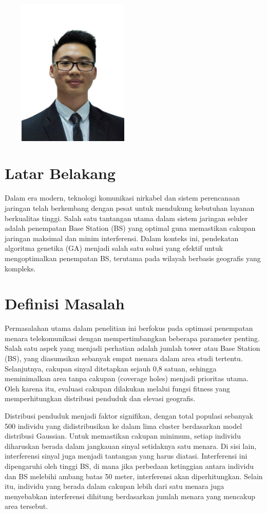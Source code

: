 \begin{center}
\includegraphics[height=200pt, width=200pt, alt=KA logo]{pp-biografi.jpg}
\end{center}
\section{Latar Belakang}
Dalam era modern, teknologi komunikasi nirkabel dan sistem perencanaan jaringan telah berkembang dengan pesat untuk mendukung kebutuhan layanan berkualitas tinggi. Salah satu tantangan utama dalam sistem jaringan seluler adalah penempatan Base Station (BS) yang optimal guna memastikan cakupan jaringan maksimal dan minim interferensi. Dalam konteks ini, pendekatan algoritma genetika (GA) menjadi salah satu solusi yang efektif untuk mengoptimalkan penempatan BS, terutama pada wilayah berbasis geografis yang kompleks.

\section{Definisi Masalah}
Permasalahan utama dalam penelitian ini berfokus pada optimasi penempatan menara telekomunikasi dengan mempertimbangkan beberapa parameter penting. Salah satu aspek yang menjadi perhatian adalah jumlah tower atau Base Station (BS), yang diasumsikan sebanyak empat menara dalam area studi tertentu. Selanjutnya, cakupan sinyal ditetapkan sejauh 0,8 satuan, sehingga meminimalkan area tanpa cakupan (coverage holes) menjadi prioritas utama. Oleh karena itu, evaluasi cakupan dilakukan melalui fungsi fitness yang memperhitungkan distribusi penduduk dan elevasi geografis.

Distribusi penduduk menjadi faktor signifikan, dengan total populasi sebanyak 500 individu yang didistribusikan ke dalam lima cluster berdasarkan model distribusi Gaussian. Untuk memastikan cakupan minimum, setiap individu diharuskan berada dalam jangkauan sinyal setidaknya satu menara. Di sisi lain, interferensi sinyal juga menjadi tantangan yang harus diatasi. Interferensi ini dipengaruhi oleh tinggi BS, di mana jika perbedaan ketinggian antara individu dan BS melebihi ambang batas 50 meter, interferensi akan diperhitungkan. Selain itu, individu yang berada dalam cakupan lebih dari satu menara juga menyebabkan interferensi dihitung berdasarkan jumlah menara yang mencakup area tersebut.

